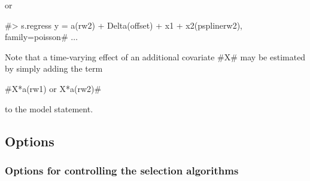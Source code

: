 or

 #> s.regress y = a(rw2) + Delta(offset) + x1 + x2(psplinerw2), family=poisson# $\ldots$

Note that a time-varying effect of an additional covariate #X# may
be estimated by simply adding the term

#X*a(rw1) or X*a(rw2)#

to the model statement.

\subsection{Options}
\label{stepwiseregregressoptions}

\subsubsection*{Options for controlling the selection algorithms}
\label{stepwise_options_algorithm}

